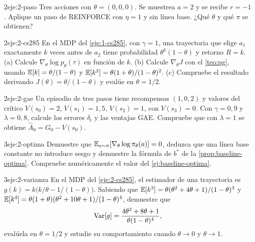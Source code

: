 \begin{ejercicio}{2}{eje:2-paso}
Tres acciones con $\theta=(0,0,0)$. Se muestrea $a=2$ y se recibe $r=-1$. Aplique un paso de REINFORCE con $\eta=1$ y sin línea base. ¿Qué $\theta$ y qué $\pi$ se obtienen?
\end{ejercicio}

\begin{ejercicio}{2}{eje:2-cs285}
En el MDP del \cref{eje:1-cs285}, con $\gamma=1$, una trayectoria que elige $a_1$ exactamente $k$ veces antes de $a_2$ tiene probabilidad $\theta^{k}(1-\theta)$ y retorno $R=k$. (a) Calcule $\nabla_\theta\log p_\theta(\tau)$ en función de $k$. (b) Calcule $\nabla_\theta J$ con el \cref{teo:pg}, usando $\mathbb{E}[k]=\theta/(1-\theta)$ y $\mathbb{E}[k^{2}]=\theta(1+\theta)/(1-\theta)^{2}$. (c) Compruebe el resultado derivando $J(\theta)=\theta/(1-\theta)$ y evalúe en $\theta=1/2$.
\end{ejercicio}

\begin{ejercicio}{2}{eje:2-gae}
Un episodio de tres pasos tiene recompensas $(1,0,2)$ y valores del crítico $V(s_0)=2$, $V(s_1)=1{,}5$, $V(s_2)=1$, con $V(s_3)=0$. Con $\gamma=0{,}9$ y $\lambda=0{,}8$, calcule los errores $\delta_t$ y las ventajas GAE. Compruebe que con $\lambda=1$ se obtiene $\widehat A_0=G_0-V(s_0)$.
\end{ejercicio}

\begin{ejercicio}{3}{eje:2-optima}
Demuestre que $\mathbb{E}_{a\sim\pi}[\nabla_\theta\log\pi_\theta(a)]=0$, deduzca que una línea base constante no introduce sesgo y demuestre la fórmula de $b^{*}$ de la \cref{prop:baseline-optima}. Compruebe numéricamente el valor del \cref{ej:baseline-optima}.
\end{ejercicio}

\begin{ejercicio}{3}{eje:2-varianza}
En el MDP del \cref{eje:2-cs285}, el estimador de una trayectoria es $g(k)=k\bigl(k/\theta-1/(1-\theta)\bigr)$. Sabiendo que $\mathbb{E}[k^{3}]=\theta(\theta^{2}+4\theta+1)/(1-\theta)^{3}$ y $\mathbb{E}[k^{4}]=\theta(1+\theta)(\theta^{2}+10\theta+1)/(1-\theta)^{4}$, demuestre que
\[
\operatorname{Var}[g]=\frac{4\theta^{2}+8\theta+1}{\theta(1-\theta)^{4}},
\]
evalúela en $\theta=1/2$ y estudie su comportamiento cuando $\theta\to 0$ y $\theta\to 1$.
\end{ejercicio}
